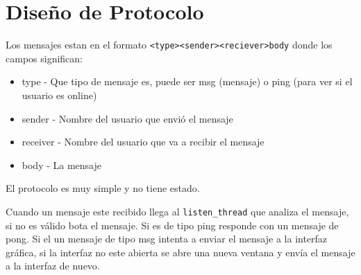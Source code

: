 \documentclass[a4paper, 12pt]{article}
\begin{document}
\section{Diseño de Protocolo}
Los mensajes estan en el formato \texttt{<type><sender><reciever>body} donde los
campos significan:
\begin{itemize}
        \item type - Que tipo de mensaje es, puede ser msg (mensaje) o ping
                (para ver si el usuario es online)
        \item sender - Nombre del usuario que envió el mensaje
        \item receiver - Nombre del usuario que va a recibir el mensaje
        \item body - La mensaje
\end{itemize}

El protocolo es muy simple y no tiene estado.

Cuando un mensaje este recibido llega al \texttt{listen\_thread} que analiza el
mensaje, si no es válido bota el mensaje. Si es de tipo ping responde con un
mensaje de pong. Si el un mensaje de tipo msg intenta a enviar el mensaje a la
interfaz gráfica, si la interfaz no este abierta se abre una nueva ventana y
envía el mensaje a la interfaz de nuevo.
\end{document}
